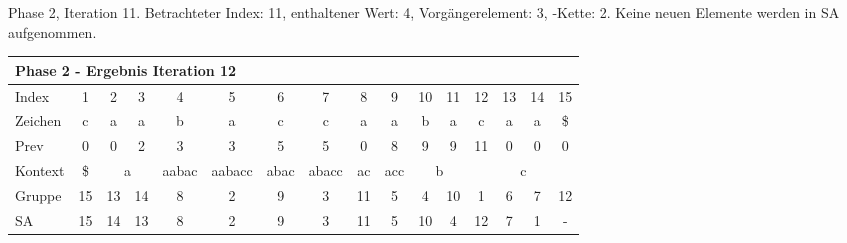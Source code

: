 \begin{table}[H]
\caption[Phase 2, Iteration 11]{Phase 2, Iteration 11. Betrachteter Index: 11, enthaltener Wert: 4, Vorgängerelement: 3, \prevpointer-Kette: 2. Keine neuen Elemente werden in SA aufgenommen.}
\label{table_complex_example_2_11} 
\end{table}

\begin{table}[H]
\centering
\begin{adjustbox}{max width=\textwidth}
\centering
\begin{tabular}{lccccccccccccccc}
\multicolumn{16}{l}{Phase 2 - Ergebnis Iteration 12}                                                                                                                                                                                                                                                                                      \\ \hline
\multicolumn{1}{l|}{Index}   & 1                       & 2  & 3                       & 4                          & 5                           & 6                         & 7                          & 8                       & 9                        & 10 & 11                      & 12                         & 13 & 14 & 15 \\
\multicolumn{1}{l|}{Zeichen} & c                       & a  & a                       & b                          & a                           & c                         & c                          & a                       & a                        & b  & a                       & c                          & a  & a  & \$ \\
\multicolumn{1}{l|}{Prev}    & 0                       & 0  & 2                       & 3                          & 3                           & 5                         & 5                          & 0                       & 8                        & 9  & 9                       & 11                         & 0  & 0  & 0  \\ \hline
\multicolumn{1}{l|}{Kontext} & \multicolumn{1}{c|}{\$} & \multicolumn{2}{c|}{a}       & \multicolumn{1}{c|}{aabac} & \multicolumn{1}{c|}{aabacc} & \multicolumn{1}{c|}{abac} & \multicolumn{1}{c|}{abacc} & \multicolumn{1}{c|}{ac} & \multicolumn{1}{c|}{acc} & \multicolumn{2}{c|}{b}       & \multicolumn{4}{c}{c}                     \\
\multicolumn{1}{l|}{Gruppe}  & \multicolumn{1}{c|}{15} & 13 & \multicolumn{1}{c|}{14} & \multicolumn{1}{c|}{8}     & \multicolumn{1}{c|}{2}      & \multicolumn{1}{c|}{9}    & \multicolumn{1}{c|}{3}     & \multicolumn{1}{c|}{11} & \multicolumn{1}{c|}{5}   & 4  & \multicolumn{1}{c|}{10} & 1                          & 6  & 7  & 12 \\
\multicolumn{1}{l|}{SA}      & \multicolumn{1}{c|}{15} & 14 & \multicolumn{1}{c|}{13} & \multicolumn{1}{c|}{8}     & \multicolumn{1}{c|}{2}      & \multicolumn{1}{c|}{9}    & \multicolumn{1}{c|}{3}     & \multicolumn{1}{c|}{11} & \multicolumn{1}{c|}{5}   & 10 & \multicolumn{1}{c|}{4}  & \cellcolor[HTML]{\green}12 & 7  & 1  & - 
\end{tabular}
\end{adjustbox}


\end{table}
